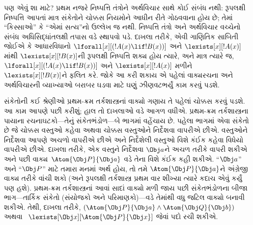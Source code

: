 પણ એવું શા માટે? પ્રથમ નજરે નિષ્પત્તિ તંત્રોને અર્થવિચાર સાથે
કોઈ સંબંધ નથી: રૂપલક્ષી નિષ્પત્તિ આપતાં માત્ર સંકેતોને ચોક્કસ
નિયમોને આધીન રીતે ગોઠવવાના હોય છે; તેમાં ``કિસ્સાઓ'' કે ``એમાં
સત્ય''નો ઉલ્લેખ જ નથી. નિષ્પત્તિ તંત્રો અને અર્થવિચાર વચ્ચેનો
સંબંધ અધિસિદ્ધાંતલક્ષી તપાસ વડે સ્થાપવો પડે. દાખલા તરીકે, એવી
ગાણિતિક સાબિતી જોઈએ કે આધારવિધાનો
$\lforall[x][(!A(x) \lif !B(x))]$ અને $\lexists[x][!A(x)]$માંથી
$\lexists[x][!B(x)]$ની રૂપલક્ષી નિષ્પત્તિ શક્ય હોય ત્યારે, અને
માત્ર ત્યારે જ, $\lforall[x][(!A(x) \lif !B(x))]$ અને
$\lexists[x][!A(x)]$ મળીને $\lexists[x][!B(x)]$ને ફલિત કરે. જોકે આ
કરી શકાય એ પહેલાં વાક્યરચના અને અર્થવિચારની વ્યાખ્યાઓ બરાબર ઘડવા માટે
ઘણું ઝીણવટભર્યું કામ કરવું પડશે.
\endgroup


\begingroup
\makeatletter{}\makeatother


\label{guunit:OLP-0141}


સંકેતોની કઈ શ્રેણીઓ પ્રથમ-ક્રમ તર્કશાસ્ત્રનાં વાક્યો ગણાય તે
પહેલાં ચોક્કસ કરવું પડશે. આ કામ આપણે પછી કરીશું; હાલ તો દાખલાઓ વડે
આગળ વધીએ. પ્રથમ-ક્રમ તર્કશાસ્ત્રના પાયાના રચનાઘટકો---તેનું
સંકેતભંડોળ---બે ભાગમાં વહેંચાય છે. પહેલા ભાગમાં એવા સંકેતો છે જે
ચોક્કસ વસ્તુઓ કહેવા અથવા ચોક્કસ વસ્તુઓને નિર્દેશવા વાપરીએ છીએ.
વસ્તુઓને નિર્દેશવા આપણે અચળો વાપરીએ છીએ અને નિર્દેશેલી
વસ્તુઓ વિશે કંઈક કહેવા વિધેયો વાપરીએ છીએ. દાખલા તરીકે, એક
વસ્તુને નિર્દેશવા $\Obj a$ને અચળ તરીકે વાપરી શકીએ અને પછી
વાક્ય~$\Atom{\Obj P}{\Obj a}$ વડે તેના વિશે કંઈક કહી શકીએ.
``$\Obj a$'' અને ``$\Obj P$'' માટે તમારા મનમાં અર્થ હોય, તો તમે
$\Atom{\Obj P}{\Obj a}$ને અંગ્રેજી વાક્ય તરીકે વાંચી શકો (અને
રૂપલક્ષી તર્કશાસ્ત્ર પ્રથમ વાર શીખ્યા ત્યારે કદાચ એવું કર્યું પણ હશે).
પ્રથમ-ક્રમ તર્કશાસ્ત્રનાં આવાં સાદાં વાક્યો મળી જાય પછી
સંકેતભંડોળના બીજા ભાગ---તાર્કિક સંકેતો (સંયોજકો અને પરિમાણકો)---વડે
તેમાંથી વધુ જટિલ વાક્યો બનાવી શકીએ. તેથી, દાખલા તરીકે,
$(\Atom{\Obj P}{\Obj a} \land \Atom{\Obj Q}{\Obj b})$ અથવા
~$\lexists[\Obj x][\Atom{\Obj P}{\Obj x}]$ જેવાં પદો રચી શકીએ.

